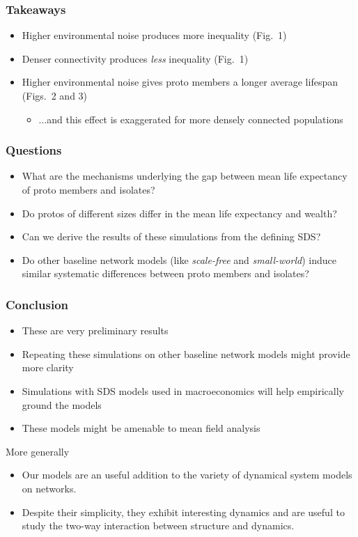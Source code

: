 \documentclass{beamer}
\begin{document}
\begin{frame}[t]
\frametitle{Takeaways}
\begin{itemize}
\itemsep1em
\item Higher environmental noise produces more inequality (Fig.~1)
\item Denser connectivity produces \textit{less} inequality (Fig.~1)
\item Higher environmental noise gives proto members a longer average lifespan (Figs.~2 and 3) 
    \begin{itemize}
    \item ...and this effect is exaggerated for more densely connected populations
    \end{itemize}
\end{itemize}

\end{frame}

\begin{frame}[t]
\frametitle{Questions}
\begin{itemize}
\item What are the mechanisms underlying the gap between mean life expectancy
of proto members and isolates?
\item Do protos of different sizes differ in the mean life expectancy
and wealth? 
\item Can we derive the results of these simulations from the defining SDS?
\item Do other baseline network models (like \textit{scale-free} and
\textit{small-world}) induce similar systematic differences between
proto members and isolates?
\end{itemize}
\end{frame}

\begin{frame}[t]
\frametitle{Conclusion}
\begin{itemize}
\item These are very preliminary results 
\item Repeating these simulations on other baseline network models might provide more clarity
\item Simulations with SDS models used in macroeconomics will help empirically ground the models  
\item These models might be amenable to mean field analysis 
\end{itemize}
\bigskip
More generally
\begin{itemize}
\item Our models are an useful addition to the variety of dynamical system
models on networks.
\item Despite their simplicity, they exhibit interesting dynamics and are useful to study the two-way interaction between structure and dynamics.  
\end{itemize}
\end{frame}
\end{document}
